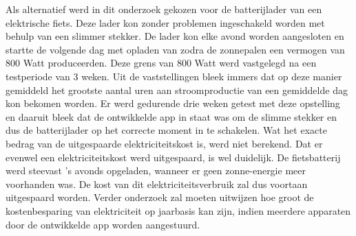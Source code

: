 Als alternatief werd in dit onderzoek gekozen voor de batterijlader van een elektrische fiets. Deze lader kon zonder problemen ingeschakeld worden met behulp van een slimmer stekker. De lader kon elke avond worden aangesloten en startte de volgende dag met opladen van zodra de zonnepalen een vermogen van 800 Watt produceerden. Deze grens van 800 Watt werd vastgelegd na een testperiode van 3 weken. Uit de vaststellingen bleek immers dat op deze manier gemiddeld het grootste aantal uren aan stroomproductie van een gemiddelde dag kon bekomen worden.  Er werd gedurende drie weken getest met deze opstelling en daaruit bleek dat de ontwikkelde app in staat was om de slimme stekker en dus de batterijlader op het correcte moment in te schakelen. Wat het exacte bedrag van de uitgespaarde elektriciteitskost is, werd niet berekend. Dat er evenwel een elektriciteitskost werd uitgespaard, is wel duidelijk. De fietsbatterij werd steevast 's avonds opgeladen, wanneer er geen zonne-energie meer voorhanden was. De kost van dit elektriciteitsverbruik zal dus voortaan uitgespaard worden. Verder onderzoek zal moeten uitwijzen hoe groot de kostenbesparing van elektriciteit op jaarbasis kan zijn, indien meerdere apparaten door de ontwikkelde app worden aangestuurd. \\
